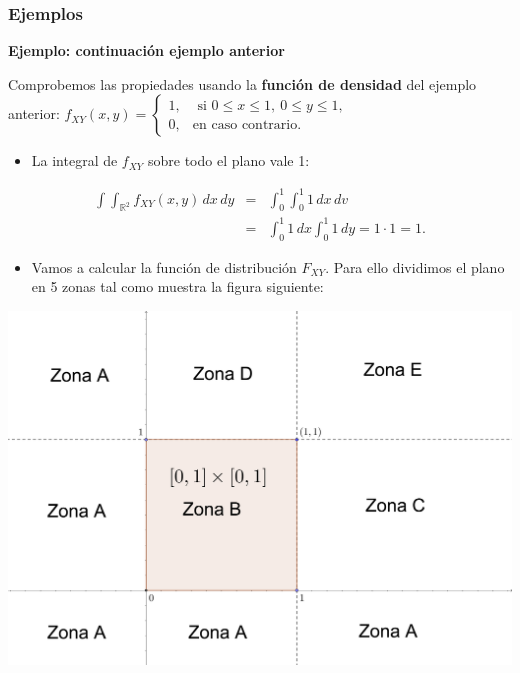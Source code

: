 \documentclass[]{book}
\providecommand{\tightlist}{%
  \setlength{\itemsep}{0pt}\setlength{\parskip}{0pt}}
\begin{document}
\hypertarget{ejemplos-4}{%
\subsubsection{Ejemplos}\label{ejemplos-4}}

\textbf{Ejemplo: continuación ejemplo anterior}

Comprobemos las propiedades usando la \textbf{función de densidad} del ejemplo anterior:
\(f_{XY}(x,y)=\begin{cases} 1, & \mbox{ si }0\leq x\leq 1,\ 0\leq y\leq 1, \\ 0, & \mbox{en caso contrario.} \end{cases}\)

\begin{itemize}
\tightlist
\item
  La integral de \(f_{XY}\) sobre todo el plano vale 1:
\end{itemize}

\[
\begin{array}{rcl}
\int\int_{\mathbb{R}^2} f_{XY}(x,y)\,dx\, dy &=&\int_0^1\int_0^1 1\, dx\, dv\\
&=&\int_0^1 1\, dx\int_0^1 1\, dy=1\cdot 1=1.
\end{array}
\]

\begin{itemize}
\tightlist
\item
  Vamos a calcular la función de distribución \(F_{XY}\). Para ello dividimos el plano en 5 zonas tal como muestra la figura siguiente:
\end{itemize}

\includegraphics{Images/VaUniformeBidi2.png}
\end{document}
